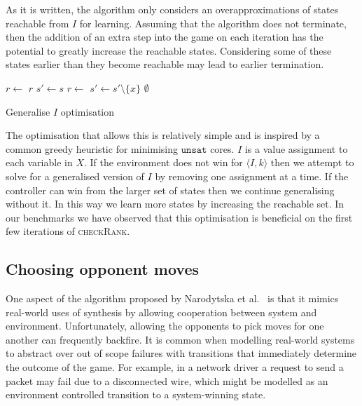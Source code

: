 \documentclass{llncs}
\begin{document}
As it is written, the algorithm only considers an overapproximations of states
reachable from $I$ for learning. Assuming that the algorithm does not
terminate, then the addition of an extra step into the game on each iteration
has the potential to greatly increase the reachable states. Considering some of
these states earlier than they become reachable may lead to earlier
termination.


\begin{algorithm}
    \begin{algorithmic}
            \State $r \gets $ 
             \Return $r$ \EndIIf
            \State $s' \gets s$
                \State $r \gets$ 
                 $s' \gets s' \setminus \{x\}$ \EndIIf
            \EndFor
            \State \Return $\emptyset$
        \EndFunction
    \end{algorithmic}
    \caption{Generalise $I$ optimisation}
    \label{alg:opt1}
\end{algorithm}

The optimisation that allows this is relatively simple and is inspired by a
common greedy heuristic for minimising $\texttt{unsat}$ cores. $I$ is a value
assignment to each variable in $X$. If the environment does not win for
$\langle I, k \rangle$ then we attempt to solve for a generalised version of
$I$ by removing one assignment at a time. If the controller can win from the
larger set of states then we continue generalising without it. In this way we
learn more states by increasing the reachable set. In our benchmarks we have
observed that this optimisation is beneficial on the first few iterations of
\textsc{checkRank}.

\subsection{Choosing opponent moves}

One aspect of the algorithm proposed by Narodytska et al.~\cite{narodytska2014}
is that it mimics real-world uses of synthesis by allowing cooperation between
system and environment. Unfortunately, allowing the opponents to pick moves for
one another can frequently backfire. It is common when modelling real-world
systems to abstract over out of scope failures with transitions that
immediately determine the outcome of the game. For example, in a network driver
a request to send a packet may fail due to a disconnected wire, which might be
modelled as an environment controlled transition to a system-winning state.
\end{document}
